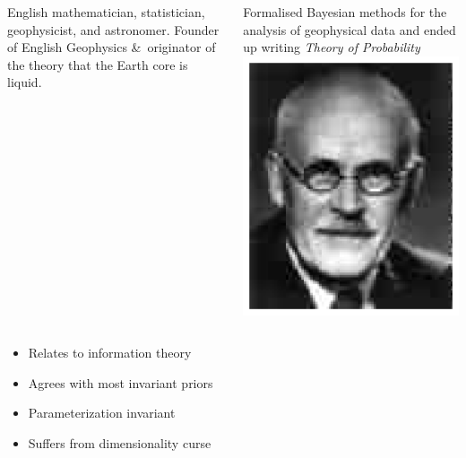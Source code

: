 \begin{slide}
\end{slide}\begin{slide}

\begin{block}{{}}
\begin{columns}
English mathematician, statistician, geophysicist, and astronomer. Founder of English Geophysics \&\
originator of the theory that the Earth core is liquid.

\pause
Formalised Bayesian methods for the analysis of geophysical data and ended up writing {\em Theory
of Probability}
\includegraphics[height=3.5truecm]{figures/Jeffreys}
\end{columns}\end{block}

\end{slide}\begin{slide}

\begin{itemize}    
\item  Relates to information theory
\pause
\item  Agrees with most invariant priors
\pause
\item  Parameterization invariant
\pause
\item  Suffers from dimensionality curse
\end{itemize}    

\end{slide}
